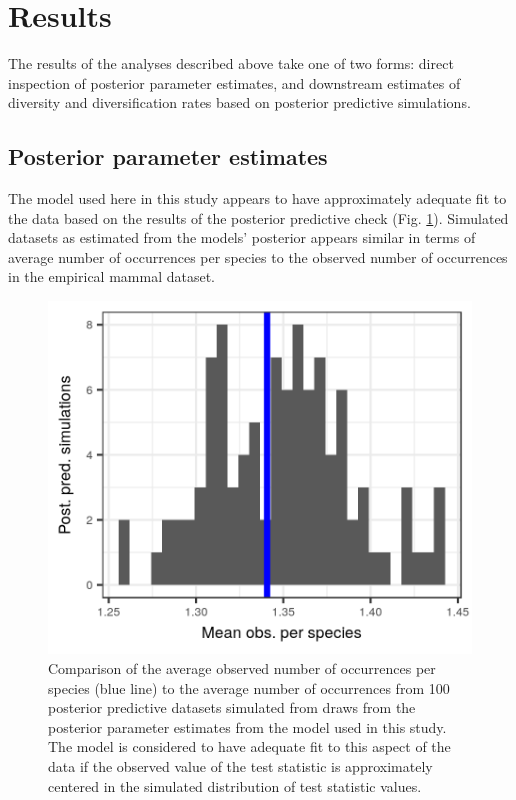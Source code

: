 \documentclass[12pt,letterpaper]{article}
\begin{document}
\section*{Results}

The results of the analyses described above take one of two forms: direct inspection of posterior parameter estimates, and downstream estimates of diversity and diversification rates based on posterior predictive simulations.

\subsection*{Posterior parameter estimates}


The model used here in this study appears to have approximately adequate fit to the data based on the results of the posterior predictive check (Fig. \ref{fig:ppc}). Simulated datasets as estimated from the models' posterior appears similar in terms of average number of occurrences per species to the observed number of occurrences in the empirical mammal dataset.
\begin{figure}[ht]
  \centering
  \includegraphics[width=\textwidth,height=0.3\textheight,keepaspectratio=true]{figure/pred_occ_bd}
  \caption[Posterior predictive check of average occurrence]{Comparison of the average observed number of occurrences per species (blue line) to the average number of occurrences from 100 posterior predictive datasets simulated from draws from the posterior parameter estimates from the model used in this study. The model is considered to have adequate fit to this aspect of the data if the observed value of the test statistic is approximately centered in the simulated distribution of test statistic values.}
  \label{fig:ppc}
\end{figure}
\end{document}
